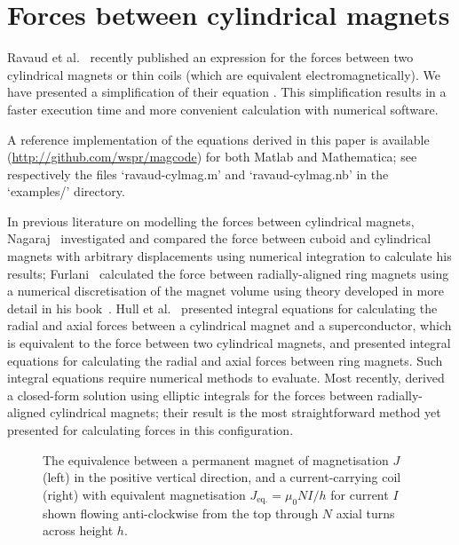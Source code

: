 \documentclass[11pt,a4paper]{memoir}
\begin{document}
\section{Forces between cylindrical magnets}

Ravaud et al.~\cite{ravaud2010-ietm} recently published an expression for the forces between two cylindrical magnets or thin coils (which are equivalent electromagnetically). We have presented a simplification of their equation \parencite{robertson2011-ietm}.
This simplification results in a faster execution time and more convenient calculation with numerical software.

A reference implementation of the equations derived in this paper is available (\url{http://github.com/wspr/magcode}) for both Matlab and Mathematica; see respectively the files `ravaud-cylmag.m' and `ravaud-cylmag.nb' in the `examples/' directory.

In previous literature on modelling the forces between cylindrical magnets,
Nagaraj~\cite{nagaraj1988} investigated and compared the force between cuboid and cylindrical magnets with arbitrary displacements using numerical integration to calculate his results; Furlani~\cite{furlani1993-ietm,furlani1993-ietm-coupl} calculated the force between radially-aligned ring magnets using a numerical discretisation of the magnet volume using theory developed in more detail in his book~\cite{furlani2001-magnetbook}. Hull et al.~\cite{hull1999-japplphys} presented integral equations for calculating the radial and axial forces between a cylindrical magnet and a superconductor, which is equivalent to the force between two cylindrical magnets, and \textcite{bassani2006-trib-int} presented integral equations for calculating the radial and axial forces between ring magnets. Such integral equations require numerical methods to evaluate.
Most recently, \textcite{ravaud2010-ietm} derived a closed-form solution using elliptic integrals for the forces between radially-aligned cylindrical magnets; their result is the most straightforward method yet presented for calculating forces in this configuration.

\begin{figure}
\centering
{}
\caption{The equivalence between a permanent magnet of magnetisation $J$ (left) in the positive vertical direction, and a current-carrying coil (right) with equivalent magnetisation $J_{\text{eq.}}=\mu_0 N I/h$ for current $I$ shown flowing anti-clockwise from the top through $N$ axial turns across height $h$.}
\end{figure}
\end{document}
